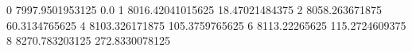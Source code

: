 0 7997.9501953125 0.0
1 8016.42041015625 18.47021484375
2 8058.263671875 60.3134765625
4 8103.326171875 105.3759765625
6 8113.22265625 115.2724609375
8 8270.783203125 272.8330078125
